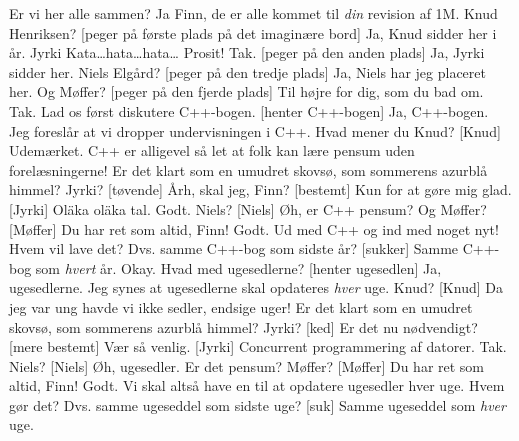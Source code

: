 \documentclass[10pt]{article}
\begin{document}
\begin{sketch}
 Er vi her alle sammen?
 Ja Finn, de er alle kommet til \emph{din} revision af 1M.
 Knud Henriksen?
 [peger på første plads på det imaginære bord] Ja, Knud sidder
her i år.
 Jyrki Kata\ldots{}hata\ldots{}hata\ldots{}
 Prosit!
 Tak.
 [peger på den anden plads] Ja, Jyrki sidder her.
 Niels Elgård?
 [peger på den tredje plads] Ja, Niels har jeg placeret her.
 Og Møffer?
 [peger på den fjerde plads] Til højre for dig, som du bad om.
 Tak. Lad os først diskutere C++-bogen.
 [henter C++-bogen] Ja, C++-bogen.
 Jeg foreslår at vi dropper undervisningen i C++. Hvad mener
         du Knud?
 [Knud] Udemærket. C++ er alligevel så let at folk kan lære
         pensum uden forelæsningerne! Er det klart som en umudret skovsø, som
         sommerens azurblå himmel?
 Jyrki?
 [tøvende] Årh, skal jeg, Finn?
 [bestemt] Kun for at gøre mig glad.
 [Jyrki] Ol\"aka ol\"aka tal.
 Godt. Niels?
 [Niels] Øh, er C++ pensum?
 Og Møffer?
 [Møffer] Du har ret som altid, Finn!
 Godt. Ud med C++ og ind med noget nyt! Hvem vil lave det?
 Dvs. samme C++-bog som sidste år?
 [sukker] Samme C++-bog som \emph{hvert} år.
 Okay. Hvad med ugesedlerne?
 [henter ugesedlen] Ja, ugesedlerne.
 Jeg synes at ugesedlerne skal opdateres \emph{hver} uge.
         Knud?
 [Knud] Da jeg var ung havde vi ikke sedler, endsige uger! Er det
         klart som en umudret skovsø, som sommerens azurblå himmel?
 Jyrki?
 [ked] Er det nu nødvendigt?
 [mere bestemt] Vær så venlig.
 [Jyrki] Concurrent programmering af datorer.
 Tak. Niels?
 [Niels] Øh, ugesedler. Er det pensum?
 Møffer?
 [Møffer] Du har ret som altid, Finn!
 Godt. Vi skal altså have en til at opdatere ugesedler hver
         uge. Hvem gør det?
 Dvs. samme ugeseddel som sidste uge?
 [suk] Samme ugeseddel som \emph{hver} uge.

\end{sketch}
\end{document}
